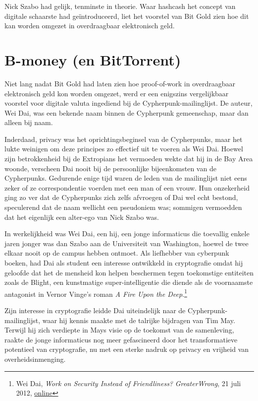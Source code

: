 \documentclass[
  a5paper,
  smalldemyvopaper,11pt,twoside,onecolumn,openright,extrafontsizes,
hidelinks]{memoir}
\begin{document}
Nick Szabo had gelijk, tenminste in theorie. Waar hashcash het concept
van digitale schaarste had geïntroduceerd, liet het voorstel van Bit
Gold zien hoe dit kan worden omgezet in overdraagbaar elektronisch geld.

\chapter{B-money (en BitTorrent)}\label{b-money-en-bittorrent}

Niet lang nadat Bit Gold had laten zien hoe proof-of-work in
overdraagbaar elektronisch geld kon worden omgezet, werd er een
enigszins vergelijkbaar voorstel voor digitale valuta ingediend bij de
Cypherpunk-mailinglijst. De auteur, Wei Dai, was een bekende naam binnen
de Cypherpunk gemeenschap, maar dan alleen bij naam.

Inderdaad, privacy was het oprichtingsbeginsel van de Cypherpunks, maar
het lukte weinigen om deze principes zo effectief uit te voeren als Wei
Dai. Hoewel zijn betrokkenheid bij de Extropians het vermoeden wekte dat
hij in de Bay Area woonde, verscheen Dai nooit bij de persoonlijke
bijeenkomsten van de Cypherpunks. Gedurende enige tijd waren de leden
van de mailinglijst niet eens zeker of ze correspondentie voerden met
een man of een vrouw. Hun onzekerheid ging zo ver dat de Cypherpunks
zich zelfs afvroegen of Dai wel echt bestond, speculerend dat de naam
wellicht een pseudoniem was; sommigen vermoedden dat het eigenlijk een
alter-ego van Nick Szabo was.

In werkelijkheid was Wei Dai, een hij, een jonge informaticus die
toevallig enkele jaren jonger was dan Szabo aan de Universiteit van
Washington, hoewel de twee elkaar nooit op de campus hebben ontmoet. Als
liefhebber van cyberpunk boeken, had Dai als student een interesse
ontwikkeld in cryptografie omdat hij geloofde dat het de mensheid kon
helpen beschermen tegen toekomstige entiteiten zoals de Blight, een
kunstmatige super-intelligentie die diende als de voornaamste antagonist
in Vernor Vinge's roman \emph{A Fire Upon the Deep}.\footnote{Wei Dai,
  \emph{Work on Security Instead of Friendliness?} \emph{GreaterWrong},
  21 juli 2012,
  \href{https://www.greaterwrong.com/posts/m8FjhuELdg7iv6boW/work-on-security-instead-of-friendliness}{online}}

Zijn interesse in cryptografie leidde Dai uiteindelijk naar de
Cypherpunk-mailinglijst, waar hij kennis maakte met de talrijke
bijdragen van Tim May. Terwijl hij zich verdiepte in Mays visie op de
toekomst van de samenleving, raakte de jonge informaticus nog meer
gefascineerd door het transformatieve potentieel van cryptografie, nu
met een sterke nadruk op privacy en vrijheid van overheidsinmenging.
\end{document}

